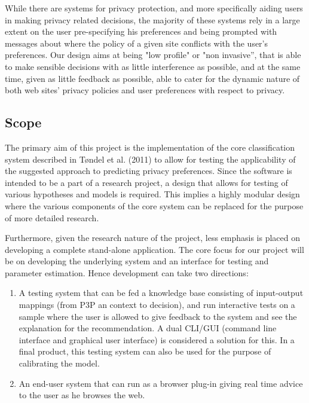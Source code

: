 While there are systems for privacy protection, and more specifically aiding users in making privacy related decisions, the majority of these systems rely in a large extent on the user pre-specifying his preferences and being prompted with messages about where the policy of a given site conflicts with the user's preferences. Our design aims at being "low profile" or "non invasive'', that is able to make sensible decisions with as little interference as possible, and at the same time, given as little feedback as possible, able to cater for the dynamic nature of both web sites' privacy policies and user preferences with respect to privacy.

\subsection{Scope}\label{reqScope}

The primary aim of this project is the implementation of the core classification system described in T{\o}ndel et al. (2011) to allow for testing the applicability of the suggested approach to predicting privacy preferences. Since the software is intended to be a part of a research project, a design that allows for testing of various hypotheses and models is required. This implies a highly modular design where the various components of the core system can be replaced for the purpose of more detailed research. 

Furthermore, given the research nature of the project, less emphasis is placed on developing a complete stand-alone application. The core focus for our project will be on developing the underlying system and an interface for testing and parameter estimation. Hence development can take two directions:

\begin{enumerate}
\item A testing system that can be fed a knowledge base consisting of input-output mappings (from P3P  an context to decision), and run interactive tests on a sample where the user is allowed to give feedback to the system and see the explanation for the recommendation. A dual CLI/GUI (command line interface and graphical user interface) is considered a solution for this. In a final product, this testing system can also be used for the purpose of calibrating the model.
\item An end-user system that can run as a browser plug-in giving real time advice to the user as he browses the web.
\end{enumerate}

